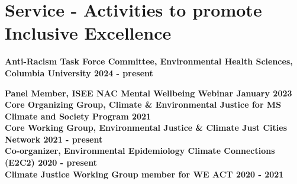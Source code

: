 \section*{Service - Activities to promote Inclusive Excellence}

\noindent \textbf{Anti-Racism Task Force Committee, Environmental Health Sciences, Columbia University \hfill \textbf{2024 - present}}

\noindent \textbf{Panel Member, ISEE NAC Mental Wellbeing Webinar \hfill January 2023}\\

\noindent \textbf{Core Organizing Group, Climate \& Environmental Justice for MS Climate and Society Program \hfill 2021}\\

\noindent \textbf{Core Working Group, Environmental Justice \& Climate Just Cities Network \hfill 2021 - present}\\

\noindent \textbf{Co-organizer, Environmental Epidemiology Climate Connections (E2C2) \hfill 2020 - present}\\

\noindent \textbf{Climate Justice Working Group member for WE ACT \hfill 2020 - 2021}\\




